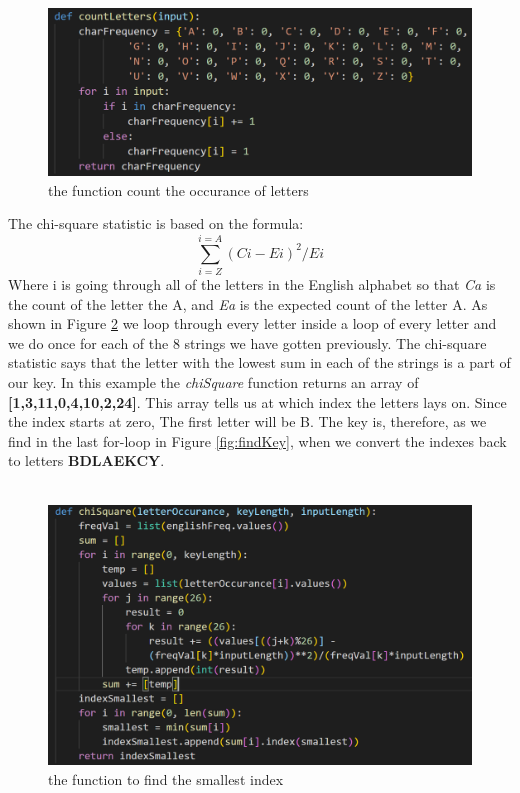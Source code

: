 \documentclass[12pt, letterpaper]{article}
\begin{document}
\begin{figure}[H]
  \includegraphics[width=\linewidth]{code_snippets/countLetters.PNG}
  \caption{the function count the occurance of letters}
  \label{fig:countLetters}
\end{figure}

The chi-square statistic is based on the formula: 
$$\sum_{i = Z}^{i = A} (Ci - Ei)^{2}/Ei $$
Where i is going through all of the letters in the English alphabet so that \textit{Ca} is the count of the letter the A, and \textit{Ea} is the expected count of the letter A. As shown in Figure \ref{fig:chiSquare} we loop through every letter inside a loop of every letter and we do once for each of the 8 strings we have gotten previously. The chi-square statistic says that the letter with the lowest sum in each of the strings is a part of our key. In this example the \textit{chiSquare} function returns an array of \textbf{[1,3,11,0,4,10,2,24]}. This array tells us at which index the letters lays on. Since the index starts at zero, The first letter will be B. The key is, therefore, as we find in the last for-loop in Figure \ref{fig:findKey}, when we convert the indexes back to letters \textbf{BDLAEKCY}. \\ \\

\begin{figure}[H]
  \includegraphics[width=\linewidth]{code_snippets/chiSquare.PNG}
  \caption{the function to find the smallest index}
  \label{fig:chiSquare}
\end{figure}
\end{document}

